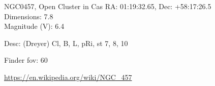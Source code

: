 \begin{block}{NGC0457, Open Cluster in Cas}
    RA: 01:19:32.65, Dec: +58:17:26.5 \\ 
    Dimensions: 7.8 \\ 
    Magnitude (V): 6.4


    Desc: (Dreyer) Cl, B, L, pRi, st 7, 8, 10 

    Finder fov: 60 

    \url{https://en.wikipedia.org/wiki/NGC_457} 
\end{block}